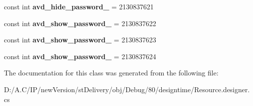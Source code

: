 \begin{DoxyCompactItemize}
\mbox{\label{classst_delivery_1_1_resource_1_1_drawable_aba9c378405193c046e9b9a6fef1cc3e4}} 
const int {\bfseries avd\+\_\+hide\+\_\+password\+\_} = 2130837621
\item 
\mbox{\label{classst_delivery_1_1_resource_1_1_drawable_a003f390b5bbcd43a1b0ed87a02839f4a}} 
const int {\bfseries avd\+\_\+show\+\_\+password\+\_} = 2130837622
\item 
\mbox{\label{classst_delivery_1_1_resource_1_1_drawable_ab067957982ff3fb5f2f8bda2ca105a8b}} 
const int {\bfseries avd\+\_\+show\+\_\+password\+\_} = 2130837623
\item 
\mbox{\label{classst_delivery_1_1_resource_1_1_drawable_a6fe551ff9ba3d39f6089133dcdaf3909}} 
const int {\bfseries avd\+\_\+show\+\_\+password\+\_} = 2130837624
\end{DoxyCompactItemize}


The documentation for this class was generated from the following file\+:\begin{DoxyCompactItemize}
\item 
D\+:/\+A.\+C/\+I\+P/new\+Version/st\+Delivery/obj/\+Debug/80/designtime/Resource.\+designer.\+cs\end{DoxyCompactItemize}
